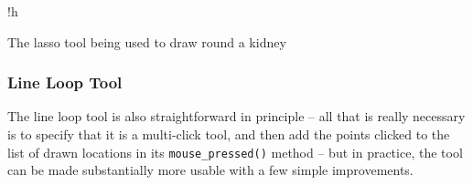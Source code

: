 \begin{stusubfig}{!h}
	\hspace{4mm}%
\caption{The lasso tool being used to draw round a kidney}
\label{fig:appendixval-lassotool}
\end{stusubfig}


\subsubsection{Line Loop Tool}


The line loop tool is also straightforward in principle -- all that is really necessary is to specify that it is a multi-click tool, and then add the points clicked to the list of drawn locations in its \texttt{mouse_pressed()} method -- but in practice, the tool can be made substantially more usable with a few simple improvements.


